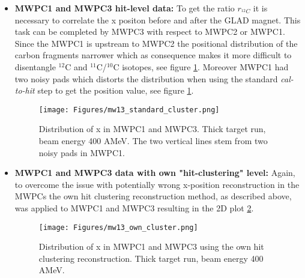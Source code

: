 \begin{itemize}
\item \textbf{MWPC1 and MWPC3 hit-level data:}\newline
To get the ratio ${r_{^{12}C}}$ it is necessary to correlate the x positon before and after the GLAD magnet. This task can be completed by MWPC3 with respect to MWPC2 or MWPC1. Since the MWPC1 is upstream to MWPC2 the positional distribution of the carbon fragments narrower which as consequence makes it more difficult to disentangle $^{12}$C and $^{11}$C/$^{10}$C isotopes, see figure \ref{fig:mw13_standard_cluster}. Moreover MWPC1 had two noisy pads which distorts the distribution when using the standard  \textit{cal-to-hit} step to get the position value, see figure \ref{fig:mw13_standard_cluster}.
\begin{figure}[htpb]
    \centering
    \texttt{[image: Figures/mw13\_standard\_cluster.png]}
    \caption{
   	 Distribution of x in MWPC1 and MWPC3. Thick target run, beam energy 400 AMeV. The two vertical lines stem from two noisy pads in MWPC1. 
     }
    \label{fig:mw13_standard_cluster}
\end{figure}
\item \textbf{MWPC1 and MWPC3 data with own "hit-clustering" level:}\newline
Again, to overcome the issue with potentially wrong x-position reconstruction in the MWPCs the own hit clustering reconstruction method, as described above, was applied to MWPC1 and MWPC3 resulting in the 2D plot \ref{fig:mw13_own_cluster}.
\begin{figure}[htpb]
    \centering
    \texttt{[image: Figures/mw13\_own\_cluster.png]}
    \caption{
   	 Distribution of x in MWPC1 and MWPC3 using the own hit clustering reconstruction. Thick target run, beam energy 400 AMeV. 
     }
    \label{fig:mw13_own_cluster}
\end{figure}


\end{itemize}
